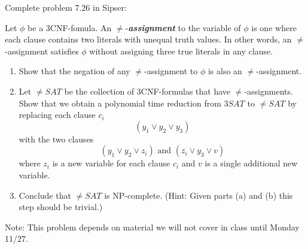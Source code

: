 Complete problem 7.26 in Sipser:

Let $\phi$ be a 3CNF-fomula. An $\ne$-{\em{\bf assignment}} to the variable of $\phi$ is one where
each clause contains two literals with unequal truth values. In other words, an $\ne$-{assignment} satisfies
$\phi$ without assigning three true literals in any clause.
\begin{enumerate}
\item Show that the negation of any $\ne$-{assignment} to $\phi$ is also an $\ne$-{assignment}.
\item Let $\ne${$SAT$} be the collection of 3CNF-formulas that have $\ne$-{assignment}s. Show that
we obtain a polynomial time reduction from $3SAT$ to $\ne${$SAT$} by replacing each clause $c_i$
\[
(y_1 \vee y_2 \vee y_3)
\]
with the two clauses
\[
(y_1 \vee y_2 \vee z_i) \mbox{ and } (\overline{z_i} \vee y_3 \vee v)
\]
where $z_i$ is a new variable for each clause $c_i$ and $v$ is a single additional new variable.

\item Conclude that $\ne${$SAT$} is NP-complete. (Hint: Given parts (a) and (b) this step should be
trivial.)
\end{enumerate}
Note: This problem depends on material we will not cover in class until Monday 11/27.



